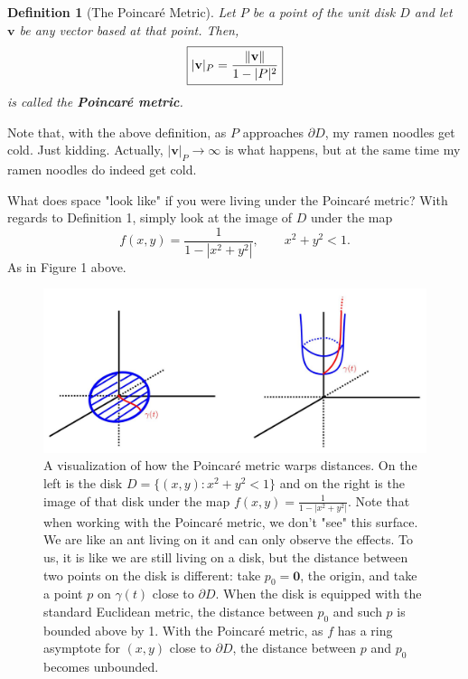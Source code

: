 \documentclass[10pt]{article}
\theoremstyle{plain}
\newtheorem{definition}{Definition}
\begin{document}
	\begin{definition}[The Poincaré Metric]
		Let $P$ be a point of the unit disk $D$ and let $\mathbf{v}$ be any vector based at that point. Then, $$\boxed{|\mathbf{v}|_P = \frac{\norm{\mathbf{v}}}{1 - |P|^2}}$$ is called the \textbf{\textit{Poincaré metric}}. 
	\end{definition}

	\noindent Note that, with the above definition, as $P$ approaches $\partial D$, my ramen noodles get cold. Just kidding. Actually, $|\mathbf{v}|_P \to \infty$ is what happens, but at the same time my ramen noodles do indeed get cold.
	
	
	What does space "look like" if you were living under the Poincaré metric? With regards to Definition 1, simply look at the image of $D$ under the map $$f(x, y) = \frac{1}{1 - |x^2 + y^2|}, \qquad x^2 + y^2 < 1.$$ As in Figure 1 above. 
	
		\begin{figure}
			\centering
			\includegraphics[scale = 0.25]{images/pcmetric.JPG}
			\caption{\small{A visualization of how the Poincaré metric warps distances. On the left is the disk $D = \{(x, y) : x^2 + y^2 < 1\}$ and on the right is the image of that disk under the map $f(x, y) = \frac{1}{1 - |x^2 + y^2|}.$ Note that when working with the Poincaré metric, we don't "see" this surface. We are like an ant living on it and can only observe the effects. To us, it is like we are still living on a disk, but the distance between two points on the disk is different: take $p_0 = \mathbf{0}$, the origin, and take a point $p$ on $\gamma(t)$ close to $\partial D$. When the disk is equipped with the standard Euclidean metric, the distance between $p_0$ and such $p$ is bounded above by 1. With the Poincaré metric, as $f$ has a ring asymptote for $(x, y)$ close to $\partial D$, the distance between $p$ and $p_0$ becomes unbounded.}} 
		\end{figure}
	
\end{document}
